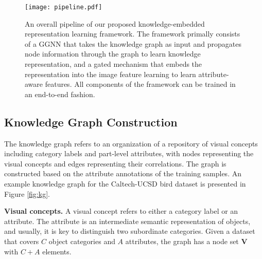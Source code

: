 \documentclass{article}
\begin{document}
\begin{figure*}[htbp]
   \centering
   \texttt{[image: pipeline.pdf]} %
   \vspace{-6pt}
   \caption{An overall pipeline of our proposed knowledge-embedded representation learning framework. The framework primally consists of a GGNN that takes the knowledge graph as input and propagates node information through the graph to learn knowledge representation, and a gated mechanism that embeds the representation into the image feature learning to learn attribute-aware features. All components of the framework can be trained in an end-to-end fashion.}
   \vspace{-6pt}
   \label{fig:pipeline}
\end{figure*}

\subsection{Knowledge Graph Construction}
The knowledge graph refers to an organization of a repository of visual concepts including category labels and part-level attributes, with nodes representing the visual concepts and edges representing their correlations. The graph is constructed based on the attribute annotations of the training samples. An example knowledge graph for the Caltech-UCSD bird dataset \cite{wah2011caltech} is presented in Figure \ref{fig:kg}.


\noindent\textbf{Visual concepts. }A visual concept refers to either a category label or an attribute. The attribute is an intermediate semantic representation of objects, and usually, it is key to distinguish two subordinate categories. Given a dataset that covers $C$ object categories and $A$ attributes, the graph has a node set $\mathbf{V}$ with $C+A$ elements.
\end{document}
